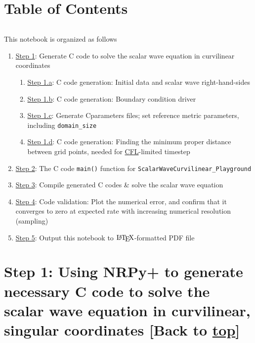 \documentclass[landscape,letterpaper,10pt,english]{article}
\providecommand{\tightlist}{%
      \setlength{\itemsep}{0pt}\setlength{\parskip}{0pt}}
\let\Oldlatex\LaTeX
\renewcommand{\LaTeX}{\textrm{\Oldlatex}}
\begin{document}
    \hypertarget{table-of-contents}{%
\section{Table of Contents}\label{table-of-contents}}

\[\label{toc}\]

This notebook is organized as follows

\begin{enumerate}
\def\labelenumi{\arabic{enumi}.}
\tightlist
\item
  \hyperref[writec]{Step 1}: Generate C code to solve the scalar wave
  equation in curvilinear coordinates

  \begin{enumerate}
  \def\labelenumii{\arabic{enumii}.}
  \tightlist
  \item
    \hyperref[id_rhss]{Step 1.a}: C code generation: Initial data and
    scalar wave right-hand-sides
  \item
    \hyperref[boundaryconditions]{Step 1.b}: C code generation: Boundary
    condition driver
  \item
    \hyperref[cparams_rfm_and_domainsize]{Step 1.c}: Generate
    Cparameters files; set reference metric parameters, including
    \texttt{domain\_size}
  \item
    \hyperref[cfl]{Step 1.d}: C code generation: Finding the minimum
    proper distance between grid points, needed for
    \href{https://en.wikipedia.org/w/index.php?title=Courant\%E2\%80\%93Friedrichs\%E2\%80\%93Lewy_condition\&oldid=806430673}{CFL}-limited
    timestep
  \end{enumerate}
\item
  \hyperref[mainc]{Step 2}: The C code \texttt{main()} function for
  \texttt{ScalarWaveCurvilinear\_Playground}
\item
  \hyperref[compileexec]{Step 3}: Compile generated C codes \& solve the
  scalar wave equation
\item
  \hyperref[convergence]{Step 4}: Code validation: Plot the numerical
  error, and confirm that it converges to zero at expected rate with
  increasing numerical resolution (sampling)
\item
  \hyperref[latex_pdf_output]{Step 5}: Output this notebook to
  \(\LaTeX\)-formatted PDF file
\end{enumerate}

    \hypertarget{step-1-using-nrpy-to-generate-necessary-c-code-to-solve-the-scalar-wave-equation-in-curvilinear-singular-coordinates-back-to-top}{%
\section{\texorpdfstring{Step 1: Using NRPy+ to generate necessary C
code to solve the scalar wave equation in curvilinear, singular
coordinates {[}Back to
\hyperref[toc]{top}{]}}{Step 1: Using NRPy+ to generate necessary C code to solve the scalar wave equation in curvilinear, singular coordinates {[}Back to {]}}}\label{step-1-using-nrpy-to-generate-necessary-c-code-to-solve-the-scalar-wave-equation-in-curvilinear-singular-coordinates-back-to-top}}
\end{document}
